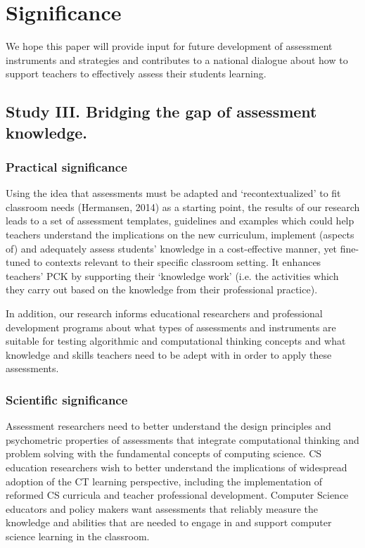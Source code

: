\section{Significance}\label{sec:significance}


We hope this paper will provide input for future development of assessment instruments and strategies and contributes to a national dialogue about how to support teachers to effectively assess their students learning.

\subsection{Study III. Bridging the gap of assessment knowledge.}
\subsubsection*{Practical significance}
Using the idea that assessments must be adapted and ‘recontextualized’ to fit classroom needs (Hermansen, 2014) as a starting point, the results of our research leads to a set of assessment templates, guidelines and examples which could help teachers understand the implications on the new curriculum, implement (aspects of) and adequately assess students’ knowledge in a cost-effective manner, yet fine-tuned to contexts relevant to their specific classroom setting. It enhances teachers’ PCK by supporting their ‘knowledge work’ (i.e. the activities which they carry out based on the knowledge from their professional practice).%

In addition, our research informs educational researchers and professional development programs about what types of assessments and instruments are suitable for testing algorithmic and computational thinking concepts and what knowledge and skills teachers need to be adept with in order to apply these assessments.

\subsubsection*{Scientific significance}

Assessment researchers need to better understand the design principles and psychometric properties of assessments that integrate computational thinking and problem solving with the fundamental concepts of computing science. CS education researchers wish to better understand the implications of widespread adoption of the CT learning perspective, including the implementation of reformed CS curricula and teacher professional development. Computer Science educators and policy makers want assessments that reliably measure the knowledge and abilities that are needed to engage in and support computer science learning in the classroom.




